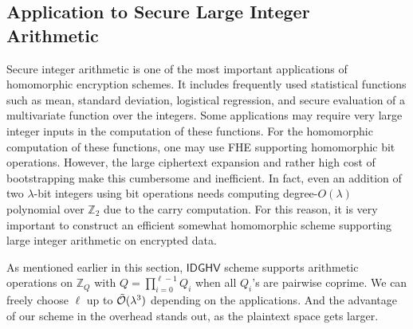 \documentclass{llncs}
\newcommand{\Ot}[1]{{\cal \tilde O}(#1)}
\newcommand{\Z}{{\mathbb Z}}
\newcommand*{\CDGHV}{\ensuremath{\mathsf{IDGHV}}}
\begin{document}
\subsection{Application to Secure Large Integer Arithmetic}
Secure integer arithmetic is one of the most important applications of homomorphic encryption schemes. 
It includes frequently used statistical functions such as mean, standard deviation, logistical regression, and secure evaluation of a multivariate function over the integers.
Some applications may require very large integer inputs in the computation of these functions. 
For the homomorphic computation of these functions, one may use FHE
supporting homomorphic bit operations. 
However, the large ciphertext expansion and rather high cost of bootstrapping make this cumbersome and inefficient. 
In fact, even an addition of two $\lambda$-bit integers using bit operations needs computing degree-$O(\lambda)$ polynomial over $\Z_2$ due to the carry computation. 
For this reason, it is very important to construct an efficient somewhat homomorphic scheme supporting large integer arithmetic on encrypted data. 

As mentioned earlier in this section, $\CDGHV$ scheme supports arithmetic operations
on $\Z_Q$ with $Q=\prod_{i=0}^{\ell-1} Q_i$ when all $Q_i$'s are pairwise coprime.
We can freely choose $\ell$ up to $\Ot{\lambda^3}$ depending on the applications.
And the advantage of our scheme in the overhead stands out, as the plaintext space gets larger. 

\end{document}
